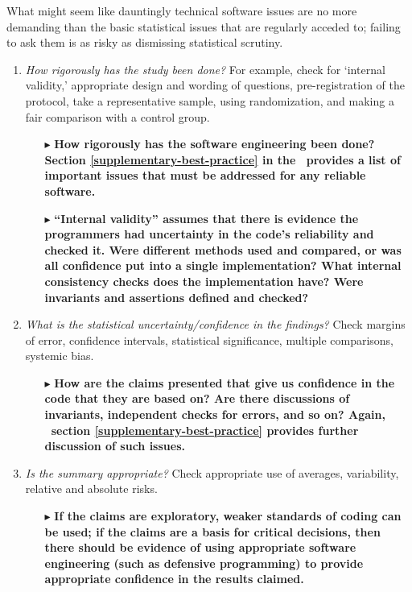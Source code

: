 \documentclass[10pt,a4paper]{article}
\begin{document}
What might seem like dauntingly technical software issues are no more demanding than the basic statistical issues that are regularly acceded to; failing to ask them is as risky as dismissing statistical scrutiny.

\def\questionsection#1{\changemysubsection{#1}}
\def\question#1{\item \emph{#1\/}}
\def\sequestion#1{\begin{itemize}\raggedright\item[$\blacktriangleright$] \textbf{#1}\end{itemize}}

\questionsection{How trustworthy are the numbers?}

\begin{enumerate}
\question{How rigorously has the study been done?} For example, check for `internal validity,' appropriate design and wording of questions, pre-registration of the protocol, take a representative sample, using randomization, and making a fair comparison with a control group.

\sequestion{How rigorously has the software engineering been done? Section \ref{supplementary-best-practice} in the \supplement\ provides a list of important issues that must be addressed for any reliable software.}

\sequestion{``Internal validity'' assumes that there is evidence the programmers had uncertainty in the code's reliability and checked it. Were different methods used and compared, or was all confidence put into a single implementation? What internal consistency checks does the implementation have? Were invariants and assertions defined and checked? }

\question{What is the statistical uncertainty/confidence in the findings?} Check margins of error, confidence intervals, statistical significance, multiple comparisons, systemic bias.

\sequestion{How are the claims presented that give us confidence in the code that they are based on? Are there discussions of invariants, independent checks for errors, and so on? Again, \supplement\ section \ref{supplementary-best-practice} provides further discussion of such issues.}

\question{Is the summary appropriate?} Check appropriate use of averages, variability, relative and absolute risks.

\sequestion{If the claims are exploratory, weaker standards of coding can be used; if the claims are a basis for critical decisions, then there should be evidence of using appropriate software engineering (such as defensive programming) to provide appropriate confidence in the results claimed.}
\setcounter{resumeCounter}{\value{enumi}}
\end{enumerate}
\end{document}
